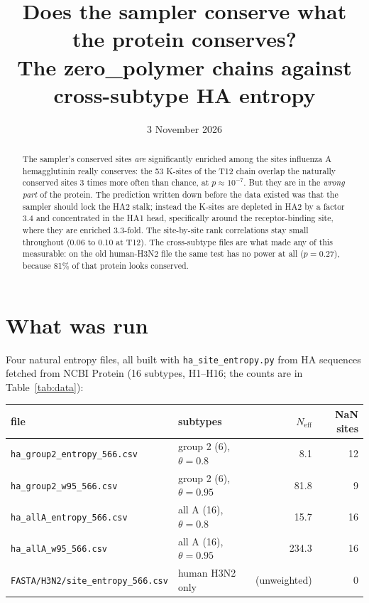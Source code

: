 \documentclass[11pt,a4paper]{article}
\title{Does the sampler conserve what the protein conserves?\\
       \large The zero\_polymer chains against cross-subtype HA entropy}
\author{}
\date{3 November 2026}
\newcommand{\file}[1]{\texttt{#1}}
\newcommand{\Neff}{N_{\mathrm{eff}}}
\begin{document}
\maketitle

\begin{abstract}
\noindent
The sampler's conserved sites \emph{are} significantly enriched among the sites
influenza A hemagglutinin really conserves: the 53 K-sites of the T12 chain
overlap the naturally conserved sites 3 times more often than chance, at
$p \approx 10^{-7}$. But they are in the \emph{wrong part} of the protein. The
prediction written down before the data existed was that the sampler should lock
the HA2 stalk; instead the K-sites are depleted in HA2 by a factor 3.4 and
concentrated in the HA1 head, specifically around the receptor-binding site,
where they are enriched 3.3-fold. The site-by-site rank correlations stay small
throughout (0.06 to 0.10 at T12). The cross-subtype files are what made any of
this measurable: on the old human-H3N2 file the same test has no power at all
($p = 0.27$), because 81\% of that protein looks conserved.
\end{abstract}

\section{What was run}

Four natural entropy files, all built with \file{ha\_site\_entropy.py} from HA
sequences fetched from NCBI Protein (16 subtypes, H1--H16; the counts are in
Table~\ref{tab:data}):

\begin{center}
\begin{tabular}{@{}llrr@{}}
\toprule
file & subtypes & $\Neff$ & NaN sites \\
\midrule
\file{ha\_group2\_entropy\_566.csv} & group 2 (6), $\theta = 0.8$  &  8.1 & 12 \\
\file{ha\_group2\_w95\_566.csv}     & group 2 (6), $\theta = 0.95$ & 81.8 &  9 \\
\file{ha\_allA\_entropy\_566.csv}   & all A (16), $\theta = 0.8$   & 15.7 & 16 \\
\file{ha\_allA\_w95\_566.csv}       & all A (16), $\theta = 0.95$  & 234.3 & 16 \\
\midrule
\file{FASTA/H3N2/site\_entropy\_566.csv} & human H3N2 only & (unweighted) & 0 \\
\bottomrule
\end{tabular}
\end{center}
\end{document}
